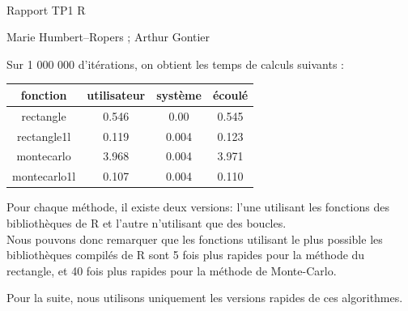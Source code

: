\documentclass[a4paper,10pt]{article}
\begin{document}
\pagestyle{empty}
{\begin{center}
  {  \\
      \vspace{1mm}
  \begin{minipage}{0.45 \textwidth}
	\begin{flushleft}
     Rapport TP1 R
	\end{flushleft}
  \end{minipage}
  \begin{minipage}{0.45 \textwidth}
	\begin{flushright}
     Marie Humbert--Ropers ; Arthur Gontier
	\end{flushright}
  \end{minipage}
  }  
\end{center}
}
{}
\vspace{1mm}
\begin{multicols}{2}
	\par{
Sur 1 000 000 d'itérations, on obtient les temps de calculs suivants :\\
    \begin{tabular}{|c|c|c|c|}
    \hline
     fonction & utilisateur & système & écoulé\\
     \hline
     rectangle & 0.546 & 0.00 & 0.545\\
     \hline
     rectangle1l & 0.119 & 0.004 & 0.123\\
     \hline
     montecarlo & 3.968 & 0.004 & 3.971\\
     \hline
     montecarlo1l & 0.107 & 0.004 & 0.110\\
     \hline
    \end{tabular}
}
\par{
Pour chaque méthode, il existe deux versions: l'une utilisant les fonctions des bibliothèques de R et l'autre n'utilisant que des boucles.\\
	Nous pouvons donc remarquer que les fonctions utilisant le plus possible les bibliothèques compilés de R sont 5 fois plus rapides pour la méthode du rectangle, et 40 fois plus rapides pour la méthode de Monte-Carlo.
}
\end{multicols}
Pour la suite, nous utilisons uniquement les versions rapides de ces algorithmes.
\end{document}

